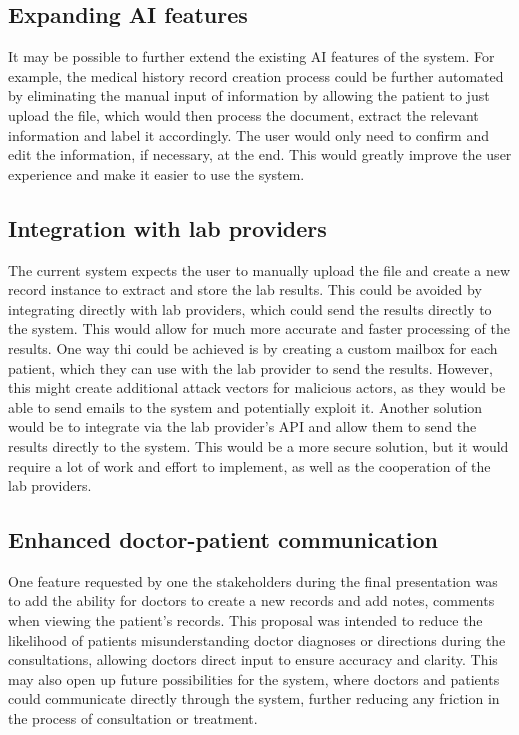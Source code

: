 \subsection{Expanding AI features}

It may be possible to further extend the existing AI features of the system. For example, the medical history record creation process could be further automated by eliminating the manual input of information by allowing the patient to just upload the file, which would then process the document, extract the relevant information and label it accordingly. The user would only need to confirm and edit the information, if necessary, at the end. This would greatly improve the user experience and make it easier to use the system.

\subsection{Integration with lab providers}

The current system expects the user to manually upload the file and create a new record instance to extract and store the lab results. This could be avoided by integrating directly with lab providers, which could send the results directly to the system. This would allow for much more accurate and faster processing of the results. One way thi could be achieved is by creating a custom mailbox for each patient, which they can use with the lab provider to send the results. However, this might create additional attack vectors for malicious actors, as they would be able to send emails to the system and potentially exploit it. Another solution would be to integrate via the lab provider's API and allow them to send the results directly to the system. This would be a more secure solution, but it would require a lot of work and effort to implement, as well as the cooperation of the lab providers.

\subsection{Enhanced doctor-patient communication}

One feature requested by one the stakeholders during the final presentation was to add the ability for doctors to create a new records and add notes, comments when viewing the patient's records. This proposal was intended to reduce the likelihood of patients misunderstanding doctor diagnoses or directions during the consultations, allowing doctors direct input to ensure accuracy and clarity. This may also open up future possibilities for the system, where doctors and patients could communicate directly through the system, further reducing any friction in the process of consultation or treatment.

